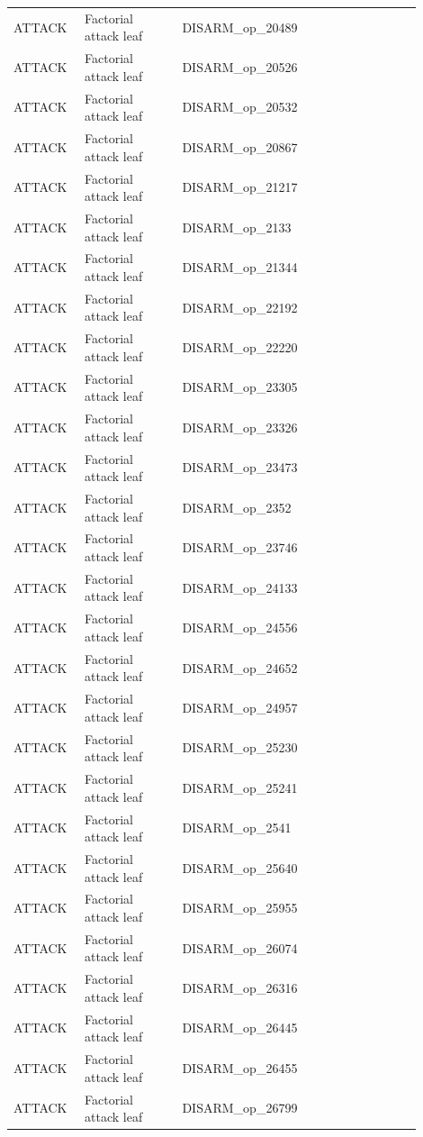 \begin{table}[htbp]
\begin{threeparttable}
\begin{tabular}{p{0.14\linewidth}p{0.22\linewidth}p{0.54\linewidth}}
ATTACK & Factorial attack leaf & DISARM\_op\_20489 \\
ATTACK & Factorial attack leaf & DISARM\_op\_20526 \\
ATTACK & Factorial attack leaf & DISARM\_op\_20532 \\
ATTACK & Factorial attack leaf & DISARM\_op\_20867 \\
ATTACK & Factorial attack leaf & DISARM\_op\_21217 \\
ATTACK & Factorial attack leaf & DISARM\_op\_2133 \\
ATTACK & Factorial attack leaf & DISARM\_op\_21344 \\
ATTACK & Factorial attack leaf & DISARM\_op\_22192 \\
ATTACK & Factorial attack leaf & DISARM\_op\_22220 \\
ATTACK & Factorial attack leaf & DISARM\_op\_23305 \\
ATTACK & Factorial attack leaf & DISARM\_op\_23326 \\
ATTACK & Factorial attack leaf & DISARM\_op\_23473 \\
ATTACK & Factorial attack leaf & DISARM\_op\_2352 \\
ATTACK & Factorial attack leaf & DISARM\_op\_23746 \\
ATTACK & Factorial attack leaf & DISARM\_op\_24133 \\
ATTACK & Factorial attack leaf & DISARM\_op\_24556 \\
ATTACK & Factorial attack leaf & DISARM\_op\_24652 \\
ATTACK & Factorial attack leaf & DISARM\_op\_24957 \\
ATTACK & Factorial attack leaf & DISARM\_op\_25230 \\
ATTACK & Factorial attack leaf & DISARM\_op\_25241 \\
ATTACK & Factorial attack leaf & DISARM\_op\_2541 \\
ATTACK & Factorial attack leaf & DISARM\_op\_25640 \\
ATTACK & Factorial attack leaf & DISARM\_op\_25955 \\
ATTACK & Factorial attack leaf & DISARM\_op\_26074 \\
ATTACK & Factorial attack leaf & DISARM\_op\_26316 \\
ATTACK & Factorial attack leaf & DISARM\_op\_26445 \\
ATTACK & Factorial attack leaf & DISARM\_op\_26455 \\
ATTACK & Factorial attack leaf & DISARM\_op\_26799 \\

\end{tabular}
\end{threeparttable}
\end{table}

